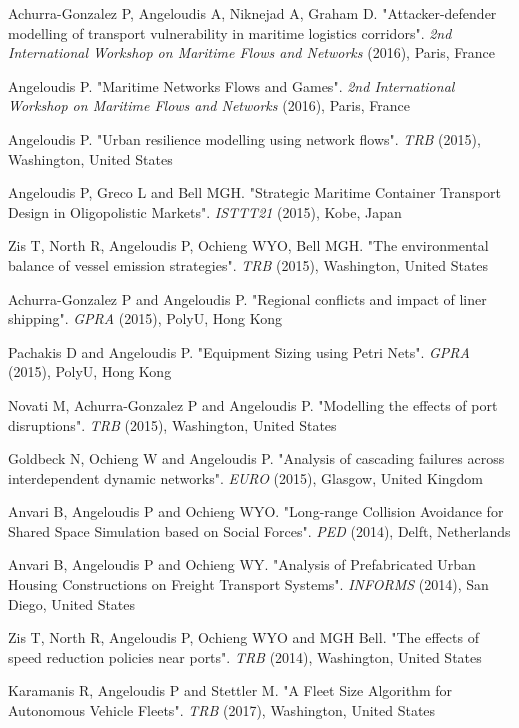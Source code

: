 \documentclass[margin]{res}
\begin{document}
\begin{resume}
\begin{etaremune}
	{Achurra-Gonzalez  P, Angeloudis A, Niknejad A, Graham D}. "{Attacker-defender modelling of transport vulnerability in maritime logistics corridors}". \textit{2nd International Workshop on Maritime Flows and Networks} (2016), Paris, France
	\item
	{Angeloudis P}. "{Maritime Networks Flows and Games}". \textit{2nd International Workshop on Maritime Flows and Networks} (2016), Paris, France
	\item
	{Angeloudis P}. "{Urban resilience modelling using network flows}". \textit{TRB} (2015), Washington, United States
	\item
	{Angeloudis P, Greco L and Bell MGH}. "{Strategic Maritime Container Transport Design in Oligopolistic Markets}". \textit{ISTTT21} (2015), Kobe, Japan
	\item
	{Zis T, North R, Angeloudis P, Ochieng WYO, Bell MGH}. "{The environmental balance of vessel emission strategies}". \textit{TRB} (2015), Washington, United States
	\item
	{Achurra-Gonzalez P and Angeloudis P}. "{Regional conflicts and impact of liner shipping}". \textit{GPRA} (2015), PolyU, Hong Kong
	\item
	{Pachakis D and Angeloudis P}. "{Equipment Sizing using Petri Nets}". \textit{GPRA} (2015), PolyU, Hong Kong
	\item
	{Novati M, Achurra-Gonzalez P and Angeloudis P}. "{Modelling the effects of port disruptions}". \textit{TRB} (2015), Washington, United States
	\item
	{Goldbeck N, Ochieng W and Angeloudis P}. "{Analysis of cascading failures across interdependent dynamic networks}". \textit{EURO} (2015), Glasgow, United Kingdom
	\item
	{Anvari B, Angeloudis P and Ochieng WYO}. "{Long-range Collision Avoidance for Shared Space Simulation based on Social Forces}". \textit{PED} (2014), Delft, Netherlands
	\item
	{Anvari B, Angeloudis P and Ochieng WY}. "{Analysis of Prefabricated Urban Housing Constructions on Freight Transport Systems}". \textit{INFORMS} (2014), San Diego, United States
	\item
	{Zis T, North R, Angeloudis P, Ochieng WYO and MGH Bell}. "{The effects of speed reduction policies near ports}". \textit{TRB} (2014), Washington, United States
	\item
	{Karamanis R, Angeloudis P and Stettler M}. "{A Fleet Size Algorithm for Autonomous Vehicle Fleets}". \textit{TRB} (2017), Washington, United States
	\item

\end{etaremune}
\end{resume}
\end{document}
